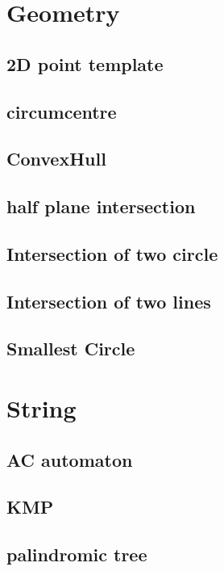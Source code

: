 \section{Geometry}
	\subsection{2D point template}
		
	\subsection{circumcentre}
		
	\subsection{ConvexHull}
		
	\subsection{half plane intersection}
		
	\subsection{Intersection of two circle}
		
	\subsection{Intersection of two lines}
		
	\subsection{Smallest Circle}
		

\section{String}
	\subsection{AC automaton}
		
	\subsection{KMP}
		
	\subsection{palindromic tree}
		
